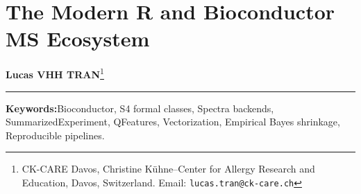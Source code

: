 \documentclass[11pt,twoside,openright]{book}
\begin{document}
\setcounter{chapter}{2}
\chapter{The Modern R and Bioconductor MS Ecosystem}
\label{chap:r_bioconductor}

\noindent
\textbf{Lucas VHH TRAN}\footnote{CK-CARE Davos, Christine K\"uhne--Center for Allergy Research and Education, Davos, Switzerland. Email: \texttt{lucas.tran@ck-care.ch}}\\
\rule{\textwidth}{0.8pt}

\begin{abstract}
\noindent
High-throughput mass spectrometry produces gigabytes of spectral time-series and high-dimensional feature arrays that exceed the computational capacity of standard spreadsheets and interactive graphical interfaces. The Bioconductor project provides a formal, peer-reviewed software ecosystem designed for high-throughput biological assays \cite{gentleman2004bioconductor, huber2015orchestrating}. Bioconductor establishes two architectural standards for computational mass spectrometry: formal S4 classes that enforce structural coordinate invariants between assay matrices and biological metadata \cite{chambers2008software}, and modular storage backends that separate user-facing operations from on-disk memory representation \cite{rainer2022spectra}. Operating on raw spectra via pointer-based backends (\texttt{MsBackendMzR}) prevents random-access memory exhaustion when processing hundreds of gigabytes of raw data \cite{gatto2021msnbase}. At the quantification tier, containers such as \texttt{SummarizedExperiment} \cite{huber2015orchestrating} and \texttt{QFeatures} \cite{gatto2023qfeatures} maintain relational integrity across hierarchical transitions from peptide-spectrum matches (PSMs) to proteins. This chapter presents the computational mechanics of vectorization, formal S4 object architectures, pluggable spectral backends, tidyverse data transformations on real PSM tables \cite{wickham2019welcome, wickham2014tidy}, and empirical Bayes variance moderation \cite{smyth2004linear, ritchie2015limma} in R 4.6.1.
\end{abstract}

\vspace{1em}
\noindent\textbf{Keywords:}\enspace Bioconductor, S4 formal classes, Spectra backends, SummarizedExperiment, QFeatures, Vectorization, Empirical Bayes shrinkage, Reproducible pipelines.

\vspace{1em}
\end{document}
